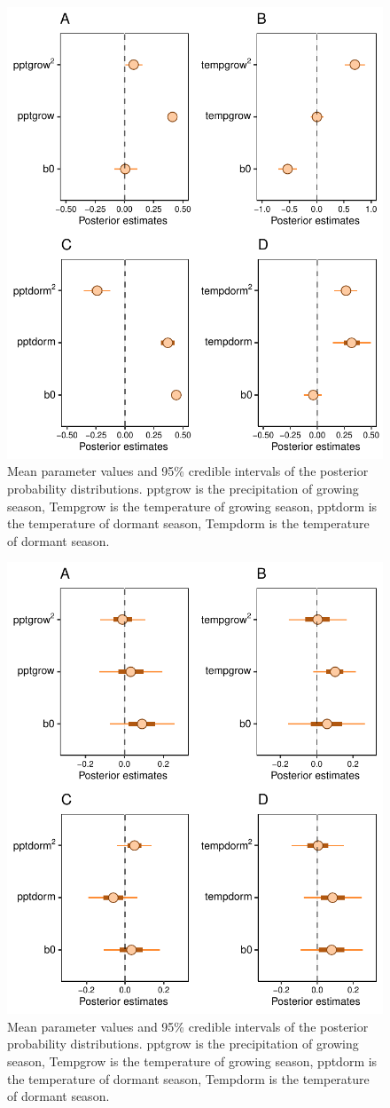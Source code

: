 \documentclass[12pt]{article}
\begin{document}
\begin{figure}[H]
		\centering
		\includegraphics[width=0.75\linewidth]{Figures/Posterior_ORS.pdf}
		\caption{Mean parameter values and 95\% credible intervals of the posterior probability distributions. 
		pptgrow is  the precipitation of growing season,
		Tempgrow is the temperature of growing season,
		pptdorm is the temperature of dormant season,
		Tempdorm is the temperature of dormant season.}
		\label{Sup:PosteriorOSR}
\end{figure}


\begin{figure}[H]
		\centering
		\includegraphics[width=0.75\linewidth]{Figures/Posterior_SR.pdf}
		\caption{Mean parameter values and 95\% credible intervals of the posterior probability distributions. 
		pptgrow is  the precipitation of growing season,
		Tempgrow is the temperature of growing season,
		pptdorm is the temperature of dormant season,
		Tempdorm is the temperature of dormant season.}
		\label{Sup:PosteriorSR}
\end{figure}
	
\end{document}
